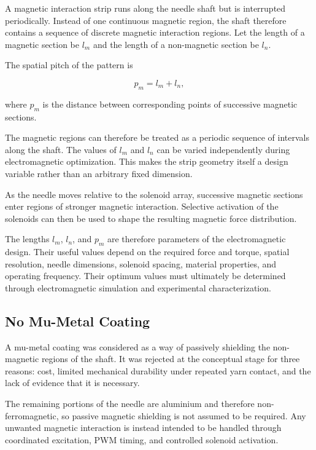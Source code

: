 \documentclass[12pt, a4paper]{article}
\begin{document}
A magnetic interaction strip runs along the needle shaft but is interrupted periodically. Instead of one continuous magnetic region, the shaft therefore contains a sequence of discrete magnetic interaction regions. Let the length of a magnetic section be $l_m$ and the length of a non-magnetic section be $l_n$.

The spatial pitch of the pattern is

\begin{equation}
p_m=l_m+l_n,
\end{equation}

where $p_m$ is the distance between corresponding points of successive magnetic sections.

The magnetic regions can therefore be treated as a periodic sequence of intervals along the shaft. The values of $l_m$ and $l_n$ can be varied independently during electromagnetic optimization. This makes the strip geometry itself a design variable rather than an arbitrary fixed dimension.

As the needle moves relative to the solenoid array, successive magnetic sections enter regions of stronger magnetic interaction. Selective activation of the solenoids can then be used to shape the resulting magnetic force distribution.

The lengths $l_m$, $l_n$, and $p_m$ are therefore parameters of the electromagnetic design. Their useful values depend on the required force and torque, spatial resolution, needle dimensions, solenoid spacing, material properties, and operating frequency. Their optimum values must ultimately be determined through electromagnetic simulation and experimental characterization.

\subsection{No Mu-Metal Coating}

A mu-metal coating was considered as a way of passively shielding the non-magnetic regions of the shaft. It was rejected at the conceptual stage for three reasons: cost, limited mechanical durability under repeated yarn contact, and the lack of evidence that it is necessary.

The remaining portions of the needle are aluminium and therefore non-ferromagnetic, so passive magnetic shielding is not assumed to be required. Any unwanted magnetic interaction is instead intended to be handled through coordinated excitation, PWM timing, and controlled solenoid activation.
\end{document}
